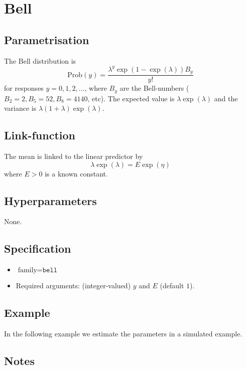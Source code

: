 \documentclass[a4paper,11pt]{article}
\begin{document}
\section*{Bell}

\subsection*{Parametrisation}

The Bell distribution is
\begin{displaymath}
    \text{Prob}(y) = \frac{\lambda^{y} \exp(1-\exp(\lambda)) B_y}{y!}
\end{displaymath}
for responses $y=0, 1, 2, \ldots$, where $B_y$ are the Bell-numbers
($B_2=2, B_5=52, B_8=4140$, etc). The expected value is
$\lambda\exp(\lambda)$ and the variance is
$\lambda(1+\lambda)\exp(\lambda)$.



\subsection*{Link-function}

The mean is linked to the linear predictor by
\begin{displaymath}
    \lambda\exp(\lambda) = E \exp(\eta)
\end{displaymath}
where $E>0$ is a known constant.

\subsection*{Hyperparameters}
None.

\subsection*{Specification}

\begin{itemize}
\item $\text{family}=\texttt{bell}$
\item Required arguments: (integer-valued) $y$ and $E$ (default $1$).
\end{itemize}


\subsection*{Example}

In the following example we estimate the parameters in a simulated
example.
{\small}

\subsection*{Notes}
\end{document}
